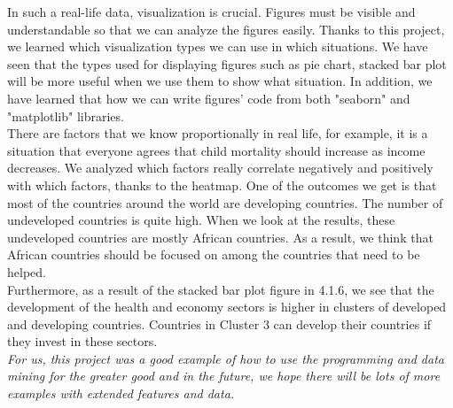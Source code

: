 \documentclass[onecolumn]{article}
\begin{document}
In such a real-life data, visualization is crucial. Figures must be visible and understandable so that we can analyze the figures easily. Thanks to this project, we learned which visualization types we can use in which situations. We have seen that the types used for displaying figures such as pie chart, stacked bar plot will be more useful when we use them to show what situation. In addition, we have learned that how we can write figures' code from both "seaborn" and "matplotlib" libraries.\\


There are factors that we know proportionally in real life, for example, it is a situation that everyone agrees that child mortality should increase as income decreases. We analyzed which factors really correlate negatively and positively with which factors, thanks to the heatmap.
One of the outcomes we get is that most of the countries around the world are developing countries. The number of undeveloped countries is quite high. When we look at the results, these undeveloped countries are mostly African countries. As a result, we think that African countries should be focused on among the countries that need to be helped.\\


Furthermore, as a result of the stacked bar plot figure in 4.1.6, we see that the development of the health and economy sectors is higher in clusters of developed and developing countries. Countries in Cluster 3 can develop their countries if they invest in these sectors. \\


\emph{For us, this project was a good example of how to use the programming and data mining for the greater good and in the future, we hope there will be lots of more examples with extended features and data.}
\nocite{*}


\end{document}
